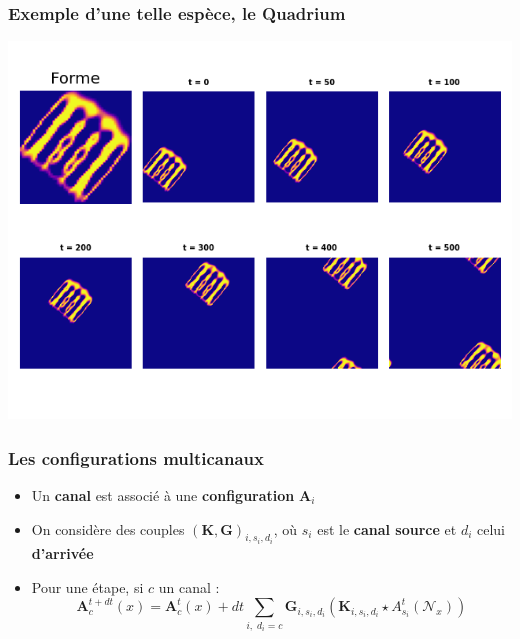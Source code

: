 \documentclass[aspectratio=43]{beamer}
\begin{document}
\begin{frame}
	\frametitle{Exemple d'une telle esp\`ece, le Quadrium}
	\centering\includegraphics[width=\textwidth]{evolution_quadrium.png}
\end{frame}

\begin{frame}
	\frametitle{Les configurations multicanaux}
	
	\begin{itemize}
		\item Un \textbf{canal} est associ\'e \`a une \textbf{configuration} $\mathbf{A}_i$
		\item On consid\`ere des couples $(\mathbf{K}, \mathbf{G})_{i, s_i, d_i}$, o\`u $s_i$ est le \textbf{canal source} et $d_i$ celui \textbf{d'arriv\'ee}
		\item Pour une \'etape, si $c$ un canal :
		\[
			\mathbf{A}^{t+dt}_c(x) = \mathbf{A}^t_c(x) + dt \sum_{i ,\; d_i = c} \mathbf{G}_{i, s_i, d_i}(\mathbf{K}_{i, s_i, d_i} \star A_{s_i}^t(\mathcal{N}_x))  
		\]
	\end{itemize}
\end{frame}
\end{document}
